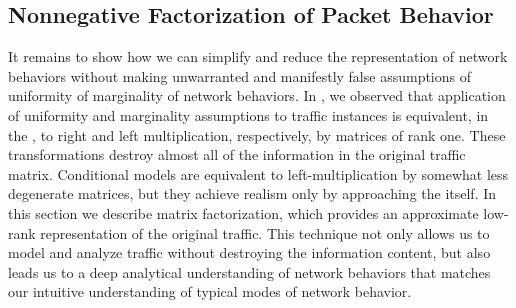 \documentclass[twocolumn,final]{svjour3}
\begin{document}
\subsection{Nonnegative Factorization of Packet Behavior}




It remains to show how we can simplify and reduce the representation of network behaviors without making unwarranted and manifestly false assumptions of uniformity of marginality of network behaviors.
In , we observed that application of uniformity and marginality assumptions to traffic instances is equivalent, in the , to right and left multiplication, respectively, by matrices of rank one. These transformations destroy almost all of the information in the original traffic matrix.
Conditional models are equivalent to left-multiplication by somewhat less degenerate matrices, but they achieve realism only by approaching the  itself.
In this section we describe matrix factorization, which provides an approximate low-rank representation of the original traffic.
This technique not only allows us to model and analyze traffic without destroying the information content, but also leads us to a deep analytical understanding of network behaviors that matches our intuitive understanding of typical modes of network behavior.
\end{document}
